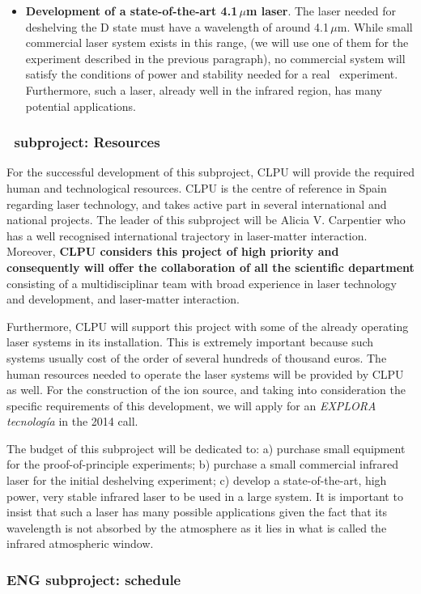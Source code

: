 \begin{itemize}
\item \textbf{Development of a state-of-the-art 4.1\,$\mu$m laser}. The laser needed for
deshelving the D state must have a wavelength of around 4.1\,$\mu$m. While small commercial laser system exists in this range, (we will use one of them for the experiment described in the previous paragraph), no commercial system will satisfy the conditions of power and stability needed for a real \BATA\ experiment. Furthermore, such a laser, already well in the infrared region, has many potential applications.	
	
\end{itemize}

\subsubsection*{\BATA\ subproject: Resources}

For the successful development of this subproject, CLPU will provide the required human and technological resources. CLPU is the centre of reference in Spain regarding laser technology, and takes active part in several international and national projects. The leader of this subproject will be Alicia V. Carpentier who has a well recognised international trajectory in laser-matter interaction. Moreover, {\bf CLPU considers this project of high priority and consequently will offer the collaboration of all the scientific department} consisting of a multidisciplinar team with broad experience in laser technology and development, and laser-matter interaction. 

Furthermore, CLPU will support this project with some of the already operating laser systems in its installation. This is extremely important because such systems usually cost of the order of several hundreds of thousand euros. The human resources needed to operate the laser systems will be provided by CLPU as well. For the construction of the ion source, and taking into consideration the specific requirements of this development, we will apply for an \emph{EXPLORA tecnología} in the 2014 call. 

The budget of this subproject will be dedicated to: a) purchase small equipment for the proof-of-principle experiments; b) purchase a small commercial infrared laser for the initial deshelving experiment; c) develop a state-of-the-art, high power, very stable infrared laser to be used in a large system. It is important to insist that such a laser has many possible applications given the fact that its wavelength is not absorbed by the atmosphere as it lies in what is called the infrared atmospheric window.


\subsubsection*{ENG subproject: schedule}



